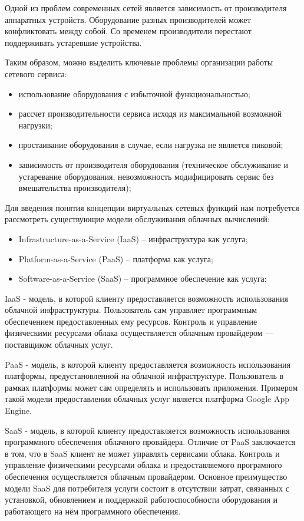 \documentclass[oneside,final,14pt,a4paper]{extreport}
\begin{document}
Одной из проблем современных сетей является зависимость от производителя аппаратных устройств. Оборудование разных производителей может конфликтовать между собой. Со временем производители перестают поддерживать устаревшие устройства.

Таким образом, можно выделить ключевые проблемы организации работы сетевого сервиса:
\begin{itemize}
	\item использование оборудования с избыточной функциональностью;
	\item рассчет производительности сервиса исходя из максимальной возможной нагрузки;
	\item простаивание оборудования в случае, если нагрузка не является пиковой;
	\item зависимость от производителя оборудования (техническое обслуживание и устаревание оборудования, невозможность модифицировать сервис без вмешательства производителя);
\end{itemize}

Для введения понятия концепции виртуальных сетевых функций нам потребуется рассмотреть существующие модели обслуживания облачных вычислений: 
\begin{itemize}
	\item Infrastructure-as-a-Service (IaaS) -- инфраструктура как услуга;
	\item Platform-as-a-Service (PaaS) --  платформа как услуга;
	\item Software-as-a-Service (SaaS) -- программное обеспечение как услуга;
\end{itemize}

IaaS - модель, в которой клиенту предоставляется возможность использования облачной инфраструктуры. Пользователь сам управляет программным обеспечением предоставленных ему ресурсов. Контроль и управление физическими ресурсами облака осуществляется облачным провайдером --- поставщиком облачных услуг.

PaaS - модель, в которой клиенту предоставляется возможность использования платформы, предустановленной на облачной инфраструктуре. Пользователь в рамках платформы может сам определять и использовать приложения. Примером такой модели предоставления облачных услуг является платформа Google App Engine.\cite{bib:google-app-engine}

SaaS - модель, в которой клиенту предоставляется возможность использования программного обеспечения облачного провайдера. Отличие от PaaS заключается в том, что в SaaS клиент не может управлять сервисами облака.  Контроль и управление физическими ресурсами облака и предоставляемого програмного обеспечения осуществляется облачным провайдером. Основное преимущество модели SaaS для потребителя услуги состоит в отсутствии затрат, связанных с установкой, обновлением и поддержкой работоспособности оборудования и работающего на нём программного обеспечения.~\cite{bib:saas}
\end{document}
